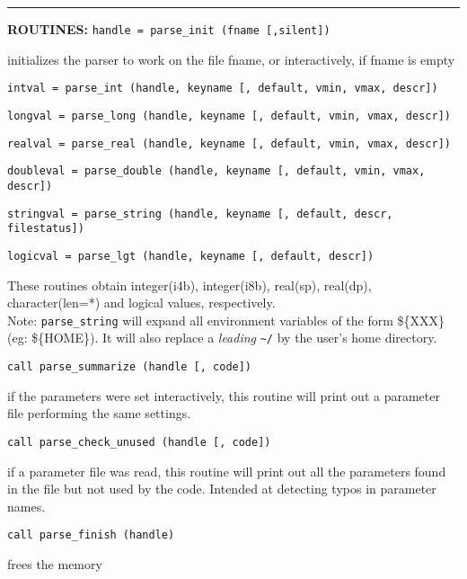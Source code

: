 \rule{\hsize}{0.7mm}
\textsc{\large{\textbf{ROUTINES: }}}\hfill\newline
{\tt handle = parse\_init (fname [,silent])} 

\quad initializes the parser to work on the file fname, or interactively, if fname is empty

{\tt intval = parse\_int (handle, keyname [, default, vmin, vmax, descr])} 

{\tt longval = parse\_long (handle, keyname [, default, vmin, vmax, descr])} 

{\tt realval = parse\_real (handle, keyname [, default, vmin, vmax, descr])} 

{\tt doubleval = parse\_double (handle, keyname [, default, vmin, vmax, descr])} 

{\tt stringval = parse\_string (handle, keyname [, default, descr, filestatus])} 

{\tt logicval = parse\_lgt (handle, keyname [, default, descr])} 

\quad These routines obtain integer(i4b), integer(i8b), real(sp), real(dp), character(len=*) and logical values,
respectively. \\
Note: {\tt parse\_string} will expand all environment variables of
the form \$\{XXX\} (eg: \$\{HOME\}). It will also replace a {\em leading} 
\texttt{\textasciitilde/}
by the user's home directory.

{\tt call parse\_summarize (handle [, code])}

\quad if the parameters were set interactively, this routine will print out a 
parameter file performing the same settings.

{\tt call parse\_check\_unused (handle [, code])}

\quad if a parameter file was read, this routine will print out all the parameters
found in the file but not used by the code. Intended at detecting typos in
parameter names.

{\tt call parse\_finish (handle)}

\quad frees the memory

